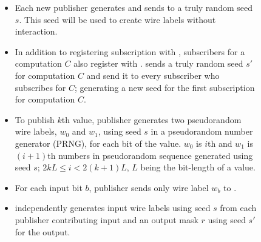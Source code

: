 \begin{figure}
\begin{mdframed}[style=myframe]

\initialize
\begin{itemize}[leftmargin=*,itemsep=2pt,topsep=2pt]
 
	\item Each new publisher generates and sends to \garbler a truly random seed
		$s$. This seed will be used to create wire labels without interaction.

\end{itemize}

\subscribe
\begin{itemize}[leftmargin=*,itemsep=2pt,topsep=2pt]

	\item In addition to registering subscription with \broker, subscribers for a
		computation $C$ also register with \garbler. \garbler sends a truly
		random seed $s'$ for computation $C$ and send it to every subscriber who
		subscribes for $C$; generating a new seed for the first subscription for
		computation $C$.
		
\end{itemize}

\publish
\begin{itemize}[leftmargin=*,itemsep=2pt,topsep=2pt]
		
	\item To publish $k$th value, publisher generates two pseudorandom wire
		labels, $w_0$ and $w_1$, using seed $s$ in a pseudorandom number generator
		(PRNG), for each bit of the value.  $w_0$ is $i$th and $w_1$ is $(i+1)$th
		numbers in pseudorandom sequence generated using seed $s$; $2kL \leq i <
		2(k+1)L$, $L$ being the bit-length of a value.

	\item For each input bit $b$, publisher sends only wire label $w_b$ to
		\broker.

\end{itemize}

\process
\begin{itemize}[leftmargin=*,itemsep=2pt,topsep=2pt]

	\item \garbler independently generates input wire labels using seed $s$ from
		each publisher contributing input and an output mask $r$ using seed $s'$
		for the output.

\end{itemize}


\end{mdframed}
\end{figure}
